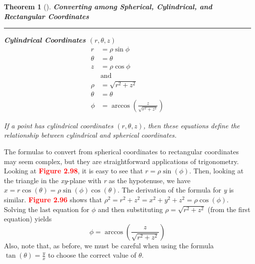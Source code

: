 \documentclass[10pt]{book}
\theoremstyle{boldcolor}
\newtheorem{theorem}{Theorem}[section]
\newenvironment{mytheorem}[2][]
  {\begin{mdframed}[style=theoremstyle]\begin{theorem}[{#1}]\textbf{ \color{cactusgreen}#2}\nobreak\textcolor{cactusgreen}{\hrule height 0.5pt}\nobreak\vspace{0.5em}\color{black}}
  {\end{theorem}\end{mdframed}}
\newcommand{\figref}[1]{\textbf{\textsf{\textcolor{red}{Figure #1}}}}
\begin{document}
\begin{mytheorem}{Converting among Spherical, Cylindrical, and Rectangular Coordinates}
\begin{multicols}{3}
        \columnbreak %

        \noindent \textbf{Cylindrical Coordinates $(r,\theta,z)$} %
        \noindent
        \begin{align*}
            r      & = \rho \sin\phi                                  \\
            \theta & = \theta                                         \\
            z      & = \rho \cos\phi                                  \\
                   & \text{and}                                       \\
            \rho   & = \sqrt{r^2 + z^2}                               \\
            \theta & = \theta                                         \\
            \phi   & = \arccos\left(\frac{z}{\sqrt{r^2 + z^2}}\right)
        \end{align*}

    \end{multicols}

    \noindent If a point has cylindrical coordinates \((r, \theta, z)\), then these equations define the relationship between cylindrical and spherical coordinates.
\end{mytheorem}

\noindent The formulas to convert from spherical coordinates to rectangular coordinates may seem complex, but they are straightforward applications of trigonometry. Looking at \figref{2.98}, it is easy to see that $r = \rho \sin(\phi)$. Then, looking at the triangle in the \textit{xy}-plane with \textit{r} as the hypotenuse, we have $x = r \cos(\theta)=\rho \sin(\phi) \cos(\theta)$. The derivation of the formula for \textit{y} is similar. \figref{2.96} shows that $\rho^2 = r^2 + z^2 = x^2 + y^2 + z^2 = \rho \cos(\phi)$. Solving the last equation for $\phi$ and then substituting  $\rho = \sqrt{r^2 + z^2}$ (from the first equation) yields $$\phi = \arccos\left(\frac{z}{\sqrt{r^2 + z^2}}\right)$$ Also, note that, as before, we must be careful when using the formula $\tan(\theta) = \frac{y}{x}$ to choose the correct value of $\theta$.
\end{document}
